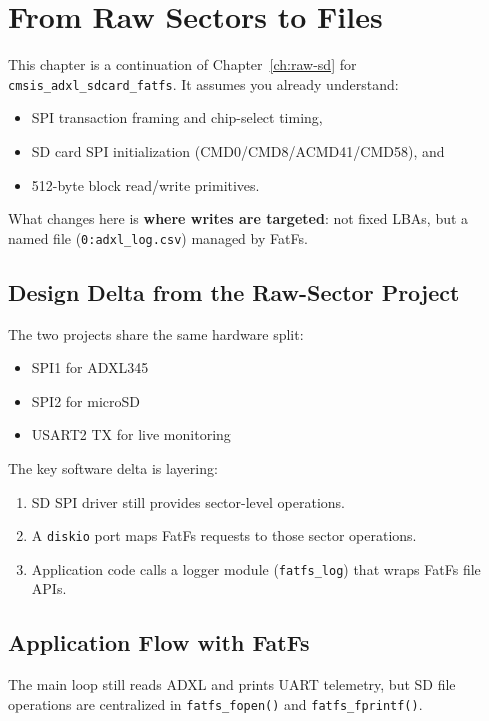 \chapter{From Raw Sectors to Files}
\label{ch:fatfs-followon}

This chapter is a continuation of Chapter~\ref{ch:raw-sd} for
\texttt{cmsis\_adxl\_sdcard\_fatfs}. It assumes you already understand:
\begin{itemize}[leftmargin=*]
\item SPI transaction framing and chip-select timing,
\item SD card SPI initialization (CMD0/CMD8/ACMD41/CMD58), and
\item 512-byte block read/write primitives.
\end{itemize}

What changes here is \textbf{where writes are targeted}: not fixed LBAs, but a named file
(\texttt{0:adxl\_log.csv}) managed by FatFs.

\section{Design Delta from the Raw-Sector Project}

The two projects share the same hardware split:
\begin{itemize}[leftmargin=*]
\item SPI1 for ADXL345
\item SPI2 for microSD
\item USART2 TX for live monitoring
\end{itemize}

The key software delta is layering:
\begin{enumerate}[leftmargin=*]
\item SD SPI driver still provides sector-level operations.
\item A \texttt{diskio} port maps FatFs requests to those sector operations.
\item Application code calls a logger module (\texttt{fatfs\_log}) that wraps FatFs file APIs.
\end{enumerate}

\section{Application Flow with FatFs}

The main loop still reads ADXL and prints UART telemetry, but SD file operations are
centralized in \texttt{fatfs\_fopen()} and \texttt{fatfs\_fprintf()}.

